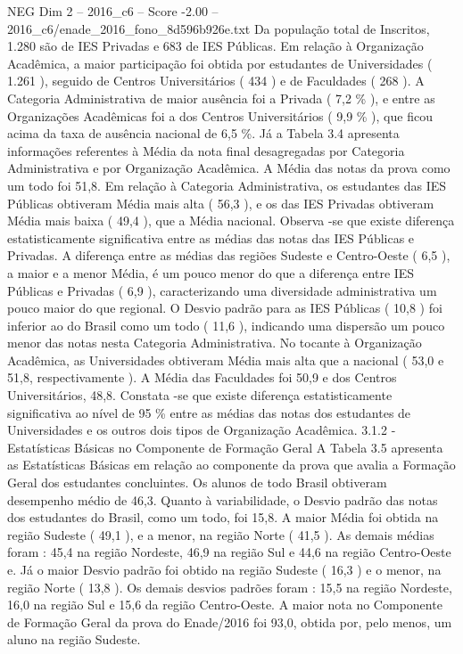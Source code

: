 \begin{textsample}{NEG Dim 2 – 2016\_c6 – Score -2.00 – 2016\_c6/enade\_2016\_fono\_8d596b926e.txt}
Da população total de Inscritos, 1.280 são de IES Privadas e 683 de IES Públicas.
Em relação à Organização Acadêmica, a maior participação foi obtida por estudantes de Universidades ( 1.261 ), seguido de Centros Universitários ( 434 ) e de Faculdades ( 268 ).
A Categoria Administrativa de maior ausência foi a Privada ( 7,2 \% ), e entre as Organizações Acadêmicas foi a dos Centros Universitários ( 9,9 \% ), que ficou acima da taxa de ausência nacional de 6,5 \%.
Já a Tabela 3.4 apresenta informações referentes à Média da nota final desagregadas por Categoria Administrativa e por Organização Acadêmica.
A Média das notas da prova como um todo foi 51,8.
Em relação à Categoria Administrativa, os estudantes das IES Públicas obtiveram Média mais alta ( 56,3 ), e os das IES Privadas obtiveram Média mais baixa ( 49,4 ), que a Média nacional.
Observa -se que existe diferença estatisticamente significativa entre as médias das notas das IES Públicas e Privadas.
A diferença entre as médias das regiões Sudeste e Centro-Oeste ( 6,5 ), a maior e a menor Média, é um pouco menor do que a diferença entre IES Públicas e Privadas ( 6,9 ), caracterizando uma diversidade administrativa um pouco maior do que regional.
O Desvio padrão para as IES Públicas ( 10,8 ) foi inferior ao do Brasil como um todo ( 11,6 ), indicando uma dispersão um pouco menor das notas nesta Categoria Administrativa.
No tocante à Organização Acadêmica, as Universidades obtiveram Média mais alta que a nacional ( 53,0 e 51,8, respectivamente ).
A Média das Faculdades foi 50,9 e dos Centros Universitários, 48,8.
Constata -se que existe diferença estatisticamente significativa ao nível de 95 \% entre as médias das notas dos estudantes de Universidades e os outros dois tipos de Organização Acadêmica. 3.1.2 - Estatísticas Básicas no Componente de Formação Geral A Tabela 3.5 apresenta as Estatísticas Básicas em relação ao componente da prova que avalia a Formação Geral dos estudantes concluintes.
Os alunos de todo Brasil obtiveram desempenho médio de 46,3.
Quanto à variabilidade, o Desvio padrão das notas dos estudantes do Brasil, como um todo, foi 15,8.
A maior Média foi obtida na região Sudeste ( 49,1 ), e a menor, na região Norte ( 41,5 ).
As demais médias foram : 45,4 na região Nordeste, 46,9 na região Sul e 44,6 na região Centro-Oeste e.
Já o maior Desvio padrão foi obtido na região Sudeste ( 16,3 ) e o menor, na região Norte ( 13,8 ).
Os demais desvios padrões foram : 15,5 na região Nordeste, 16,0 na região Sul e 15,6 da região Centro-Oeste.
A maior nota no Componente de Formação Geral da prova do Enade/2016 foi 93,0, obtida por, pelo menos, um aluno na região Sudeste.

\end{textsample}
